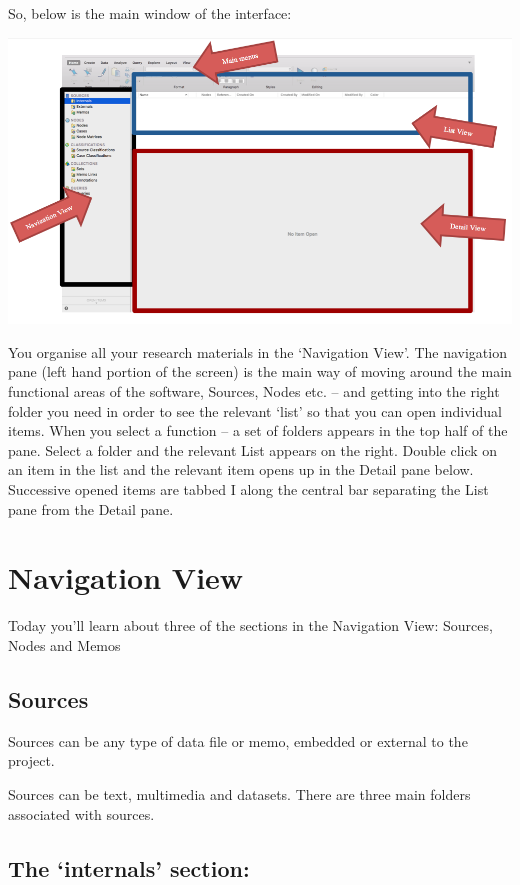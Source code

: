 \documentclass[]{book}
\theoremstyle{definition}
\theoremstyle{definition}
\theoremstyle{definition}
\theoremstyle{remark}
\begin{document}
So, below is the main window of the interface:

\includegraphics{imgs/qual_09.png}

You organise all your research materials in the `Navigation View'. The
navigation pane (left hand portion of the screen) is the main way of
moving around the main functional areas of the software, Sources, Nodes
etc. -- and getting into the right folder you need in order to see the
relevant `list' so that you can open individual items. When you select a
function -- a set of folders appears in the top half of the pane. Select
a folder and the relevant List appears on the right. Double click on an
item in the list and the relevant item opens up in the Detail pane
below. Successive opened items are tabbed I along the central bar
separating the List pane from the Detail pane.

\hypertarget{navigation-view}{%
\section{Navigation View}\label{navigation-view}}

Today you'll learn about three of the sections in the Navigation View:
Sources, Nodes and Memos

\hypertarget{sources}{%
\subsection{Sources}\label{sources}}

Sources can be any type of data file or memo, embedded or external to
the project.

Sources can be text, multimedia and datasets. There are three main
folders associated with sources.

\hypertarget{the-internals-section}{%
\subsection{The `internals' section:}\label{the-internals-section}}
\end{document}
